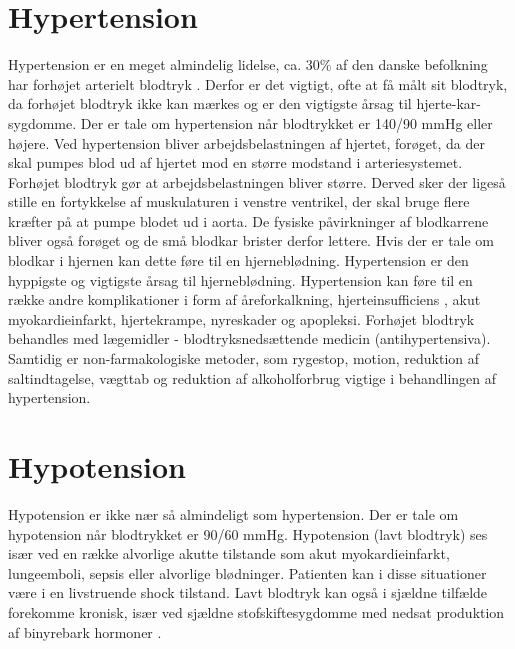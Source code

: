 \section{Hypertension} 
Hypertension er en meget almindelig lidelse, ca. 30\% af den danske befolkning har forhøjet arterielt blodtryk \cite{Hypertension}. Derfor er det vigtigt, ofte at få målt sit blodtryk, da forhøjet blodtryk ikke kan mærkes og er den vigtigste årsag til hjerte-kar-sygdomme. 
Der er tale om hypertension når blodtrykket er 140/90 mmHg eller højere.
Ved hypertension bliver arbejdsbelastningen af hjertet, forøget, da der skal pumpes blod ud af hjertet mod en større modstand i arteriesystemet. \\
Forhøjet blodtryk gør at arbejdsbelastningen bliver større. Derved sker der ligeså stille en fortykkelse af muskulaturen i venstre ventrikel, der skal bruge flere kræfter på at pumpe blodet ud i aorta. 
De fysiske påvirkninger af blodkarrene bliver også forøget og de små blodkar brister derfor lettere. Hvis der er tale om blodkar i hjernen kan dette føre til en hjerneblødning. Hypertension er den hyppigste og vigtigste årsag til hjerneblødning.
Hypertension kan føre til en række andre komplikationer i form af åreforkalkning, hjerteinsufficiens \cite{Hjerteinsufficiens}, akut myokardieinfarkt, hjertekrampe, nyreskader og apopleksi.
Forhøjet blodtryk behandles med lægemidler - blodtryksnedsættende medicin (antihypertensiva). Samtidig er non-farmakologiske metoder, som rygestop, motion, reduktion af saltindtagelse, vægttab og reduktion af alkoholforbrug vigtige i behandlingen af hypertension. 

\section{Hypotension} 
Hypotension er ikke nær så almindeligt som hypertension. Der er tale om hypotension når blodtrykket er 90/60 mmHg. Hypotension (lavt blodtryk) ses især ved en række alvorlige akutte tilstande som akut myokardieinfarkt, lungeemboli, sepsis eller alvorlige blødninger. Patienten kan i disse situationer være i en livstruende shock tilstand. Lavt blodtryk kan også i sjældne tilfælde forekomme kronisk, især ved sjældne stofskiftesygdomme med nedsat produktion af binyrebark hormoner \cite{Hypotension}.   